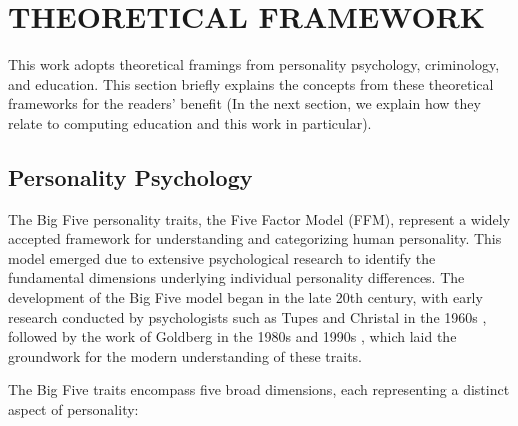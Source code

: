 \section{THEORETICAL FRAMEWORK} \label{sec:frameworks}
This work adopts theoretical framings from personality psychology, criminology, and education. This section briefly explains the concepts from these theoretical frameworks for the readers' benefit (In the next section, we explain how they relate to computing education and this work in particular). 

\subsection{Personality Psychology}
The Big Five personality traits, the Five Factor Model (FFM), represent a widely accepted framework for understanding and categorizing human personality. This model emerged due to extensive psychological research to identify the fundamental dimensions underlying individual personality differences. The development of the Big Five model began in the late 20th century, with early research conducted by psychologists such as Tupes and Christal in the 1960s \cite{tupesRECURRENTPERSONALITYFACTORS}, followed by the work of Goldberg in the 1980s and 1990s \cite{Goldberg1990, Goldberg}, which laid the groundwork for the modern understanding of these traits.

The Big Five traits encompass five broad dimensions, each representing a distinct aspect of personality:

